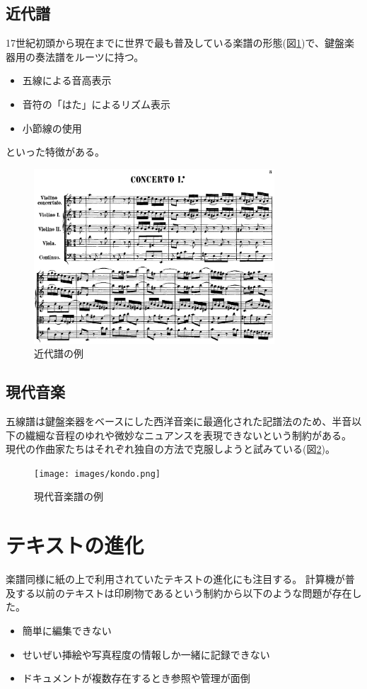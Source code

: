 \subsection{近代譜}
17世紀初頭から現在までに世界で最も普及している楽譜の形態(図\ref{kindai})で、鍵盤楽器用の奏法譜をルーツに持つ。
\begin{itemize}
    \item 五線による音高表示
    \item 音符の「はた」によるリズム表示
    \item 小節線の使用
\end{itemize}といった特徴がある。

\begin{figure}[H]
    \centering
    \includegraphics[width=9cm]{images/kindai.png}
    \caption{近代譜の例}
    \label{kindai}
\end{figure}

\subsection{現代音楽}
五線譜は鍵盤楽器をベースにした西洋音楽に最適化された記譜法のため、半音以下の繊細な音程のゆれや微妙なニュアンスを表現できないという制約がある。
現代の作曲家たちはそれぞれ独自の方法で克服しようと試みている(図\ref{kondo})。

\begin{figure}[H]
    \centering
    \texttt{[image: images/kondo.png]}
    \caption{現代音楽譜の例}
    \label{kondo}
\end{figure}

\section{テキストの進化}
楽譜同様に紙の上で利用されていたテキストの進化にも注目する。
計算機が普及する以前のテキストは印刷物であるという制約から以下のような問題が存在した。
\begin{itemize}
    \item 簡単に編集できない
    \item せいぜい挿絵や写真程度の情報しか一緒に記録できない
    \item ドキュメントが複数存在するとき参照や管理が面倒
\end{itemize}

